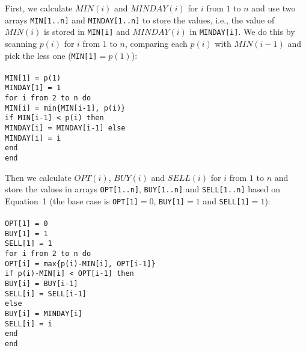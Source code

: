 \documentclass[12pt,letterpaper]{article}
\begin{document}
First, we calculate $MIN(i)$ and $MINDAY(i)$ for $i$ from $1$ to $n$ and use two arrays \texttt{MIN[1..n]} and \texttt{MINDAY[1..n]} to store the values, i.e., the value of $MIN(i)$ is stored in \texttt{MIN[i]} and $MINDAY(i)$ in \texttt{MINDAY[i]}. We do this by scanning $p(i)$ for $i$ from $1$ to $n$, comparing each $p(i)$ with $MIN(i-1)$ and pick the less one (\texttt{MIN[1]}$ = p(1)$):
\\\tt
\\
MIN[1] = p(1)\\
MINDAY[1] = 1\\
for i from 2 to n do\\
\mbox{\hspace{2em}}MIN[i] = min\{MIN[i-1], p(i)\}\\
\mbox{\hspace{2em}}if MIN[i-1] < p(i) then\\
\mbox{\hspace{4em}}MINDAY[i] = MINDAY[i-1] else\\
\mbox{\hspace{4em}}MINDAY[i] = i\\
\mbox{\hspace{2em}}end\\
end\\
\rm

Then we calculate $OPT(i)$, $BUY(i)$ and $SELL(i)$ for $i$ from $1$ to $n$ and store the values in arrays \texttt{OPT[1..n]}, \texttt{BUY[1..n]} and \texttt{SELL[1..n]} based on Equation~1 (the base case is \texttt{OPT[1]}$ = 0$, \texttt{BUY[1]}$ = 1$ and \texttt{SELL[1]}$ = 1$):
\\\tt
\\
OPT[1] = 0\\
BUY[1] = 1\\
SELL[1] = 1\\
for i from 2 to n do\\
\mbox{\hspace{2em}}OPT[i] = max\{p(i)-MIN[i], OPT[i-1]\}\\
\mbox{\hspace{2em}}if p(i)-MIN[i] < OPT[i-1] then\\
\mbox{\hspace{4em}}BUY[i] = BUY[i-1]\\
\mbox{\hspace{4em}}SELL[i] = SELL[i-1]\\
\mbox{\hspace{2em}}else\\
\mbox{\hspace{4em}}BUY[i] = MINDAY[i]\\
\mbox{\hspace{4em}}SELL[i] = i\\
\mbox{\hspace{2em}}end\\
end\\
\rm
\end{document}

